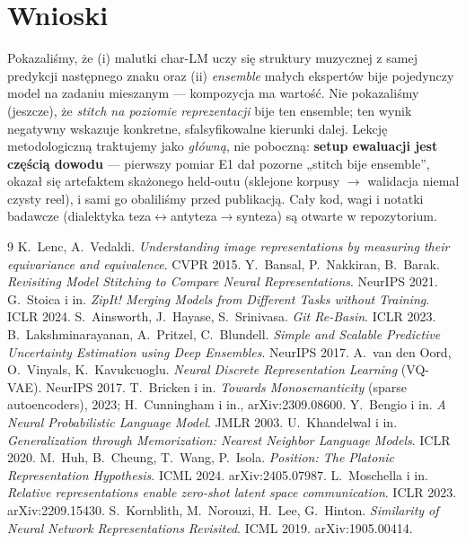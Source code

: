 \documentclass[11pt]{article}
\begin{document}
\section{Wnioski}
Pokazaliśmy, że (i) malutki char-LM uczy się struktury muzycznej z samej predykcji następnego znaku oraz (ii)
\emph{ensemble} małych ekspertów bije pojedynczy model na zadaniu mieszanym --- kompozycja ma wartość. Nie
pokazaliśmy (jeszcze), że \emph{stitch na poziomie reprezentacji} bije ten ensemble; ten wynik negatywny wskazuje
konkretne, sfalsyfikowalne kierunki dalej. Lekcję metodologiczną traktujemy jako \emph{główną}, nie poboczną:
\textbf{setup ewaluacji jest częścią dowodu} --- pierwszy pomiar E1 dał pozorne „stitch bije ensemble'', okazał się
artefaktem skażonego held-outu (sklejone korpusy $\to$ walidacja niemal czysty reel), i sami go obaliliśmy przed
publikacją. Cały kod, wagi i notatki badawcze (dialektyka teza$\leftrightarrow$antyteza$\to$synteza) są otwarte w repozytorium.

\begin{thebibliography}{9}
 K.~Lenc, A.~Vedaldi. \emph{Understanding image representations by measuring their equivariance and equivalence}. CVPR 2015.
 Y.~Bansal, P.~Nakkiran, B.~Barak. \emph{Revisiting Model Stitching to Compare Neural Representations}. NeurIPS 2021.
 G.~Stoica i in. \emph{ZipIt! Merging Models from Different Tasks without Training}. ICLR 2024.
 S.~Ainsworth, J.~Hayase, S.~Srinivasa. \emph{Git Re-Basin}. ICLR 2023.
 B.~Lakshminarayanan, A.~Pritzel, C.~Blundell. \emph{Simple and Scalable Predictive Uncertainty Estimation using Deep Ensembles}. NeurIPS 2017.
 A.~van den Oord, O.~Vinyals, K.~Kavukcuoglu. \emph{Neural Discrete Representation Learning} (VQ-VAE). NeurIPS 2017.
 T.~Bricken i in. \emph{Towards Monosemanticity} (sparse autoencoders), 2023; H.~Cunningham i in., arXiv:2309.08600.
 Y.~Bengio i in. \emph{A Neural Probabilistic Language Model}. JMLR 2003.
 U.~Khandelwal i in. \emph{Generalization through Memorization: Nearest Neighbor Language Models}. ICLR 2020.
 M.~Huh, B.~Cheung, T.~Wang, P.~Isola. \emph{Position: The Platonic Representation Hypothesis}. ICML 2024. arXiv:2405.07987.
 L.~Moschella i in. \emph{Relative representations enable zero-shot latent space communication}. ICLR 2023. arXiv:2209.15430.
 S.~Kornblith, M.~Norouzi, H.~Lee, G.~Hinton. \emph{Similarity of Neural Network Representations Revisited}. ICML 2019. arXiv:1905.00414.
\end{thebibliography}
\end{document}
